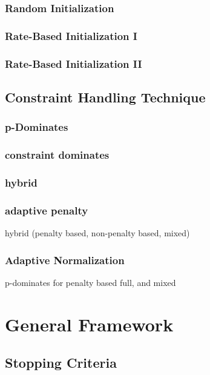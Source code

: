 \subsubsection{Random Initialization}

\subsubsection{Rate-Based Initialization I}

\subsubsection{Rate-Based Initialization II}


\subsection{Constraint Handling Technique}

\subsubsection{p-Dominates}
\subsubsection{constraint dominates}
\subsubsection{hybrid}
\subsubsection{adaptive penalty}
hybrid (penalty based, non-penalty based, mixed)
\subsubsection{Adaptive Normalization}
p-dominates for penalty based full, and mixed
\section{General Framework}

\subsection{Stopping Criteria}




